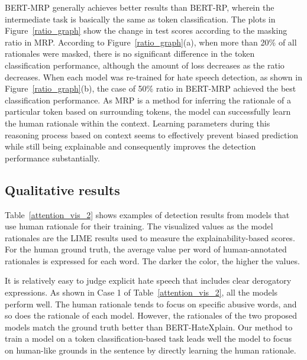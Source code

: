 \documentclass[11pt]{article}
\begin{document}
BERT-MRP generally achieves better results than BERT-RP, wherein the intermediate task is basically the same as token classification. The plots in Figure~\ref{ratio_graph} show the change in test scores according to the masking ratio in MRP. According to Figure~\ref{ratio_graph}(a), when more than 20\% of all rationales were masked, there is no significant difference in the token classification performance, although the amount of loss decreases as the ratio decreases. 
When each model was re-trained for hate speech detection, as shown in Figure~\ref{ratio_graph}(b), the case of 50\% ratio in BERT-MRP achieved the best classification performance. As MRP is a method for inferring the rationale of a particular token based on surrounding tokens, the model can successfully learn the human rationale within the context. Learning parameters during this reasoning process based on context seems to effectively prevent biased prediction while still being explainable and consequently improves the detection performance substantially. 

\subsection{Qualitative results}
Table~\ref{attention_vis_2} shows examples of detection results from models that use human rationale for their training. The visualized values as the model rationales are the LIME results used to measure the explainability-based scores. For the human ground truth, the average value per word of human-annotated rationales is expressed for each word. The darker the color, the higher the values. 

It is relatively easy to judge explicit hate speech that includes clear derogatory expressions. As shown in Case 1 of Table~\ref{attention_vis_2}, all the models perform well. The human rationale tends to focus on specific abusive words, and so does the rationale of each model. However, the rationales of the two proposed models match the ground truth better than BERT-HateXplain. Our method to train a model on a token classification-based task leads well the model to focus on human-like grounds in the sentence by directly learning the human rationale. 
\end{document}
